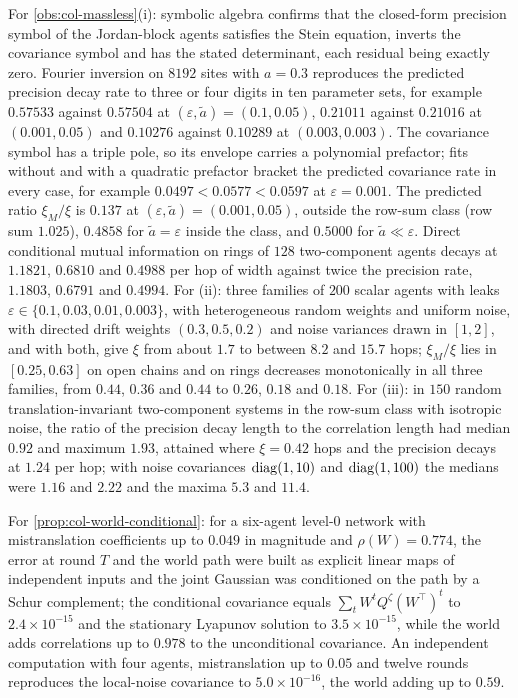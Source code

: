 \begin{numcheck}\label{chk:col-massless}
For \cref{obs:col-massless}(i): symbolic algebra confirms that the closed-form precision symbol of the Jordan-block agents satisfies the Stein equation, inverts the covariance symbol and has the stated determinant, each residual being exactly zero. Fourier inversion on $8192$ sites with $a=0.3$ reproduces the predicted precision decay rate to three or four digits in ten parameter sets, for example $0.57533$ against $0.57504$ at $(\varepsilon,\tilde a)=(0.1,0.05)$, $0.21011$ against $0.21016$ at $(0.001,0.05)$ and $0.10276$ against $0.10289$ at $(0.003,0.003)$. The covariance symbol has a triple pole, so its envelope carries a polynomial prefactor; fits without and with a quadratic prefactor bracket the predicted covariance rate in every case, for example $0.0497<0.0577<0.0597$ at $\varepsilon=0.001$. The predicted ratio $\xi_M/\xi$ is $0.137$ at $(\varepsilon,\tilde a)=(0.001,0.05)$, outside the row-sum class (row sum $1.025$), $0.4858$ for $\tilde a=\varepsilon$ inside the class, and $0.5000$ for $\tilde a\ll\varepsilon$. Direct conditional mutual information on rings of $128$ two-component agents decays at $1.1821$, $0.6810$ and $0.4988$ per hop of width against twice the precision rate, $1.1803$, $0.6791$ and $0.4994$. For (ii): three families of $200$ scalar agents with leaks $\varepsilon\in\{0.1,0.03,0.01,0.003\}$, with heterogeneous random weights and uniform noise, with directed drift weights $(0.3,0.5,0.2)$ and noise variances drawn in $[1,2]$, and with both, give $\xi$ from about $1.7$ to between $8.2$ and $15.7$ hops; $\xi_M/\xi$ lies in $[0.25,0.63]$ on open chains and on rings decreases monotonically in all three families, from $0.44$, $0.36$ and $0.44$ to $0.26$, $0.18$ and $0.18$. For (iii): in $150$ random translation-invariant two-component systems in the row-sum class with isotropic noise, the ratio of the precision decay length to the correlation length had median $0.92$ and maximum $1.93$, attained where $\xi=0.42$ hops and the precision decays at $1.24$ per hop; with noise covariances $\operatorname{diag}(1,10)$ and $\operatorname{diag}(1,100)$ the medians were $1.16$ and $2.22$ and the maxima $5.3$ and $11.4$.
\end{numcheck}

\begin{numcheck}\label{chk:col-world}
For \cref{prop:col-world-conditional}: for a six-agent level-0 network with mistranslation coefficients up to $0.049$ in magnitude and $\rho(W)=0.774$, the error at round $T$ and the world path were built as explicit linear maps of independent inputs and the joint Gaussian was conditioned on the path by a Schur complement; the conditional covariance equals $\sum_tW^tQ^{\zeta}(W^\top)^t$ to $2.4\times10^{-15}$ and the stationary Lyapunov solution to $3.5\times10^{-15}$, while the world adds correlations up to $0.978$ to the unconditional covariance. An independent computation with four agents, mistranslation up to $0.05$ and twelve rounds reproduces the local-noise covariance to $5.0\times10^{-16}$, the world adding up to $0.59$.
\end{numcheck}

